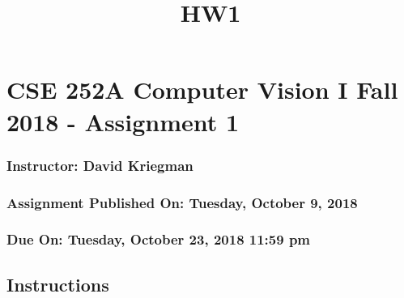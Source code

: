 \documentclass[11pt]{article}
\title{HW1}
\begin{document}
    
    
    \maketitle
    
    

    
    \section{CSE 252A Computer Vision I Fall 2018 - Assignment
1}\label{cse-252a-computer-vision-i-fall-2018---assignment-1}

\subsubsection{Instructor: David
Kriegman}\label{instructor-david-kriegman}

\subsubsection{Assignment Published On: Tuesday, October 9,
2018}\label{assignment-published-on-tuesday-october-9-2018}

\subsubsection{Due On: Tuesday, October 23, 2018 11:59
pm}\label{due-on-tuesday-october-23-2018-1159-pm}

\subsection{Instructions}\label{instructions}
\end{document}
